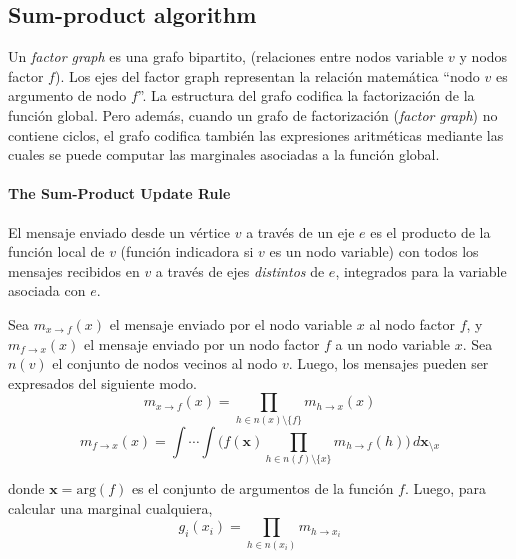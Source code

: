 \documentclass[article]{jss}
\begin{document}
\subsection{Sum-product algorithm}

Un \emph{factor graph} es una grafo bipartito, (relaciones entre nodos variable $v$ y nodos factor $f$).
Los ejes del factor graph representan la relaci\'on matem\'atica ``nodo $v$ es argumento de nodo $f$''.
La estructura del grafo codifica la factorizaci\'on de la funci\'on global.
Pero adem\'as, cuando un grafo de factorizaci\'on (\emph{factor graph}) no contiene ciclos, el grafo codifica tambi\'en las expresiones aritm\'eticas mediante las cuales se puede computar las marginales asociadas a la funci\'on global.

\paragraph{The Sum-Product Update Rule} El mensaje enviado desde un v\'ertice $v$ a trav\'es de un eje $e$ es el producto de la funci\'on local de $v$ (funci\'on indicadora si $v$ es un nodo variable) con todos los mensajes recibidos en $v$ a trav\'es de ejes \emph{distintos} de $e$, integrados para la variable asociada con $e$.

\vspace{0.3cm}

Sea $m_{x \rightarrow f}(x)$ el mensaje enviado por el nodo variable $x$ al nodo factor $f$, y $m_{f \rightarrow x}(x)$ el mensaje enviado por un nodo factor $f$ a un nodo variable $x$.
Sea $n(v)$ el conjunto de nodos vecinos al nodo $v$.
Luego, los mensajes pueden ser expresados del siguiente modo.
\begin{equation}\label{eq:m_v_f} 
m_{x \rightarrow f}(x) = \prod_{h \in n(x) \setminus \{f\} } m_{h \rightarrow x}(x)
\end{equation}
\begin{equation}\label{eq:m_f_v}  
m_{f \rightarrow x}(x) = \int \cdots \int \Big( f(\bm{x}) \prod_{h \in n(f) \setminus \{x\} } m_{h \rightarrow f}(h) \Big) \,  d\bm{x}_{\setminus x}
\end{equation}

donde $\bm{x} = \text{arg}(f)$ es el conjunto de argumentos de la funci\'on $f$. 
Luego, para calcular una marginal cualquiera,
\begin{equation}\label{eq:marginal}
g_i(x_i) = \prod_{h \in n(x_i)} m_{h \rightarrow x_i}
\end{equation}
\end{document}
